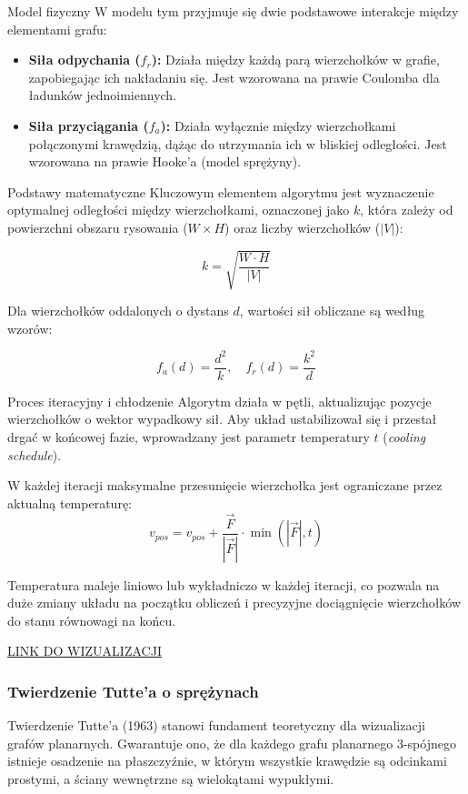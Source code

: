 \documentclass[12pt,a4paper]{article}
\begin{document}
Model fizyczny
W modelu tym przyjmuje się dwie podstawowe interakcje między elementami grafu:
\begin{itemize}
    \item \textbf{Siła odpychania ($f_r$):} Działa między każdą parą wierzchołków w grafie, zapobiegając ich nakładaniu się. Jest wzorowana na prawie Coulomba dla ładunków jednoimiennych.
    \item \textbf{Siła przyciągania ($f_a$):} Działa wyłącznie między wierzchołkami połączonymi krawędzią, dążąc do utrzymania ich w bliskiej odległości. Jest wzorowana na prawie Hooke'a (model sprężyny).
\end{itemize}

Podstawy matematyczne
Kluczowym elementem algorytmu jest wyznaczenie optymalnej odległości między wierzchołkami, oznaczonej jako $k$, która zależy od powierzchni obszaru rysowania ($W \times H$) oraz liczby wierzchołków ($|V|$):

$$k = \sqrt{\frac{W \cdot H}{|V|}}$$

Dla wierzchołków oddalonych o dystans $d$, wartości sił obliczane są według wzorów:

$$f_a(d) = \frac{d^2}{k}, \quad f_r(d) = \frac{k^2}{d}$$

Proces iteracyjny i chłodzenie
Algorytm działa w pętli, aktualizując pozycje wierzchołków o wektor wypadkowy sił. Aby układ ustabilizował się i przestał drgać w końcowej fazie, wprowadzany jest parametr temperatury $t$ (\textit{cooling schedule}).

W każdej iteracji maksymalne przesunięcie wierzchołka jest ograniczane przez aktualną temperaturę:
$$v_{pos} = v_{pos} + \frac{\vec{F}}{|\vec{F}|} \cdot \min(|\vec{F}|, t)$$

Temperatura maleje liniowo lub wykładniczo w każdej iteracji, co pozwala na duże zmiany układu na początku obliczeń i precyzyjne dociągnięcie wierzchołków do stanu równowagi na końcu.

\href{https://youtu.be/v1ZZFPmuAWo}{LINK DO WIZUALIZACJI}

\subsubsection{Twierdzenie Tutte'a o sprężynach}
Twierdzenie Tutte'a (1963) stanowi fundament teoretyczny dla wizualizacji grafów planarnych. Gwarantuje ono, że dla każdego grafu planarnego 3-spójnego istnieje osadzenie na płaszczyźnie, w którym wszystkie krawędzie są odcinkami prostymi, a ściany wewnętrzne są wielokątami wypukłymi.
\end{document}
